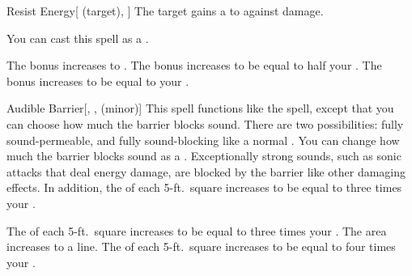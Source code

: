 \lowercase{\hypertarget{spell:Resist Energy}{}}\label{spell:Resist Energy}
\begin{attuneability}[Rank 1]{\hypertarget{spell:Resist Energy}{Resist Energy}}[ (target), ]
The target gains a   to  against  damage.

You can cast this spell as a .

\rankline
{} The bonus increases to .
 The bonus increases to be equal to half your .
 The bonus increases to be equal to your .
\end{attuneability}
\vspace{0.25em}



\lowercase{\hypertarget{spell:Audible Barrier}{}}\label{spell:Audible Barrier}
\begin{freeability}[Rank 2]{\hypertarget{spell:Audible Barrier}{Audible Barrier}}[, ,  (minor)]
\targetrule
This spell functions like the  spell, except that you can choose how much the barrier blocks sound.
There are two possibilities: fully sound-permeable, and fully sound-blocking like a normal .
You can change how much the barrier blocks sound as a .
Exceptionally strong sounds, such as sonic attacks that deal energy damage, are blocked by the barrier like other damaging effects.
In addition, the  of each 5-ft.\ square increases to be equal to three times your .

\rankline
{} The  of each 5-ft.\ square increases to be equal to three times your .
 The area increases to a \arealarge line.
 The  of each 5-ft.\ square increases to be equal to four times your .
\end{freeability}
\vspace{0.25em}



